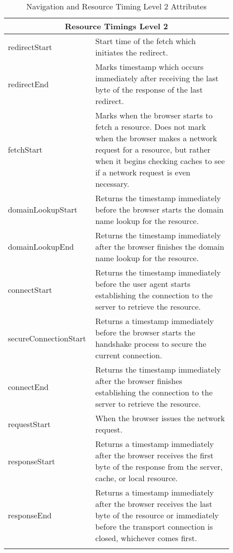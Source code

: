 \begin{center}
\begin{longtable}{ | p{0.3\linewidth} | p{0.6\linewidth} | }
	\hline
	\multicolumn{2}{|c|}{ \cellcolor{lightgrey} Resource Timings Level 2} \\
	\hline
	redirectStart & Start time of the fetch which initiates the redirect. \\
	\hline
	redirectEnd & Marks timestamp which occurs immediately after receiving the last byte of the response of the last redirect. \\
	\hline
	fetchStart & Marks when the browser starts to fetch a resource. Does not mark when the browser makes a network request for a resource, but rather when it begins checking caches to see if a network request is even necessary.  \\ %
	\hline
	domainLookupStart & Returns the timestamp immediately before the browser starts the domain name lookup for the resource. \\
	\hline
	domainLookupEnd & Returns the timestamp immediately after the browser finishes the domain name lookup for the resource. \\
	\hline
	connectStart & Returns the timestamp immediately before the user agent starts establishing the connection to the server to retrieve the resource. \\
	\hline
	secureConnectionStart & Returns a timestamp immediately before the browser starts the handshake process to secure the current connection.  \\
	\hline
	connectEnd & Returns the timestamp immediately after the browser finishes establishing the connection to the server to retrieve the resource.  \\
	\hline
	requestStart & When the browser issues the network request.  \\%
	\hline
	responseStart & Returns a timestamp immediately after the browser receives the first byte of the response from the server, cache, or local resource. \\
	\hline
	responseEnd & Returns a timestamp immediately after the browser receives the last byte of the resource or immediately before the transport connection is closed, whichever comes first. \\
	\hline
	\caption{Navigation and Resource Timing Level 2 Attributes} %
	\label{tab:navigationtiming}
	\end{longtable}
\end{center}

